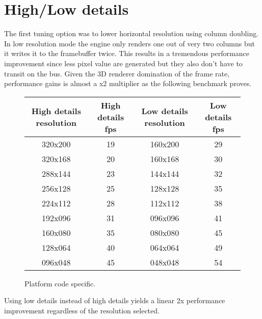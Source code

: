 \section{High/Low details}
The first tuning option was to lower horizontal resolution using column doubling. In low resolution mode the engine only renders one out of very two columns but it writes it to the framebuffer twice. This results in a tremendous performance improvement since less pixel value are generated but they also don't have to transit on the bus. Given the 3D renderer domination of the frame rate, performance gains is almost a x2 multiplier as the following benchmark proves.\\
\par
 \vspace{0.5cm}
\begin{figure}[H]
\centering  
\begin{tabularx}{\textwidth}{ C{1} C{1} C{1} C{1} } 
  \toprule
  \textbf{High details resolution} & \textbf{High details fps} &  \textbf{Low details resolution}  & \textbf{Low details fps}\\
  \toprule 
320x200  &  19   & 160x200  &       29 \\
320x168  &  20   & 160x168  &       30 \\
288x144  &  23   & 144x144  &       32 \\
256x128  &  25   & 128x128  &       35 \\
224x112  &  28   & 112x112  &       38 \\
192x096  &  31   & 096x096  &       41 \\
160x080  &  35   & 080x080  &       45 \\
128x064  &  40   & 064x064  &       49 \\
096x048  &  45   & 048x048  &       54 \\
  \toprule
\end{tabularx}
\caption{Platform code specific.\protect\footnotemark}
\end{figure}
\par
Using low details instead of high details yields a linear 2x performance improvement regardless of the resolution selected.



